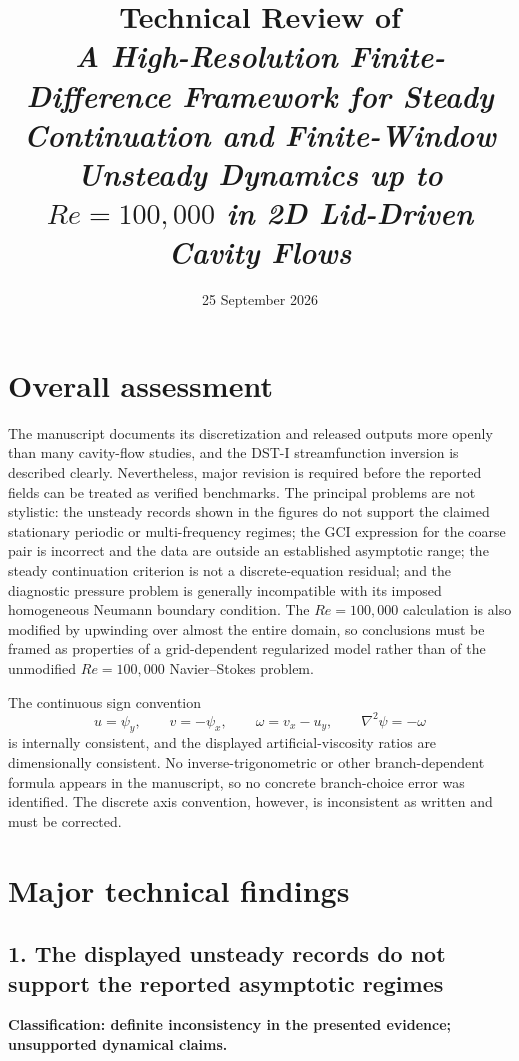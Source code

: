 \documentclass[11pt]{article}
\title{Technical Review of\\
\emph{A High-Resolution Finite-Difference Framework for Steady Continuation and Finite-Window Unsteady Dynamics up to $Re=100{,}000$ in 2D Lid-Driven Cavity Flows}}
\author{}
\date{25 September 2026}
\begin{document}
\maketitle

\section*{Overall assessment}

The manuscript documents its discretization and released outputs more openly than many cavity-flow studies, and the DST-I streamfunction inversion is described clearly.  Nevertheless, major revision is required before the reported fields can be treated as verified benchmarks.  The principal problems are not stylistic: the unsteady records shown in the figures do not support the claimed stationary periodic or multi-frequency regimes; the GCI expression for the coarse pair is incorrect and the data are outside an established asymptotic range; the steady continuation criterion is not a discrete-equation residual; and the diagnostic pressure problem is generally incompatible with its imposed homogeneous Neumann boundary condition.  The $Re=100{,}000$ calculation is also modified by upwinding over almost the entire domain, so conclusions must be framed as properties of a grid-dependent regularized model rather than of the unmodified $Re=100{,}000$ Navier--Stokes problem.

The continuous sign convention
\[
u=\psi_y,\qquad v=-\psi_x,\qquad \omega=v_x-u_y,
\qquad \nabla^2\psi=-\omega
\]
is internally consistent, and the displayed artificial-viscosity ratios are dimensionally consistent.  No inverse-trigonometric or other branch-dependent formula appears in the manuscript, so no concrete branch-choice error was identified.  The discrete axis convention, however, is inconsistent as written and must be corrected.

\section*{Major technical findings}

\subsection*{1. The displayed unsteady records do not support the reported asymptotic regimes}

\textbf{Classification: definite inconsistency in the presented evidence; unsupported dynamical claims.}
\end{document}
